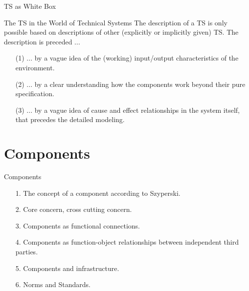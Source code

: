 \documentclass{beamer}
\begin{document}
\begin{frame}{TS as White Box}
  \begin{block}{The TS in the World of Technical Systems}
    The description of a TS is only possible based on descriptions of other
    (explicitly or implicitly given) TS. The description is preceded ...
    \begin{itemize}
    \item[(1)] ... by a vague idea of the (working) input/output
      characteristics of the environment.
    \item [(2)] ... by a clear understanding how the components work beyond
      their pure specification.
    \item [(3)] ... by a vague idea of cause and effect relationships in the
      system itself, that precedes the detailed modeling.
    \end{itemize}
  \end{block}
\end{frame}
\section{Components}
\begin{frame}{Components}
  \begin{itemize}
  \item [1.] The concept of a component according to Szyperski.
  \item [2.] Core concern, cross cutting concern.
  \item [3.] Components as functional connections.
  \item [4.] Components as function-object relationships between independent
    third parties.
  \item [5.] Components and infrastructure.
  \item [6.] Norms and Standards.
  \end{itemize}
\end{frame}
\end{document}
